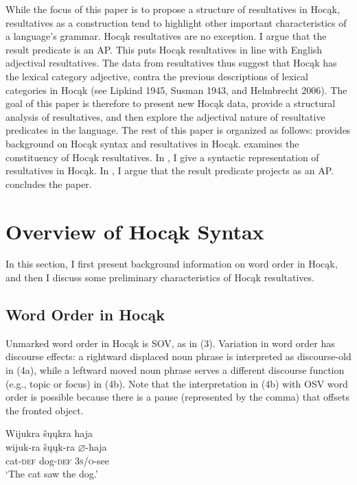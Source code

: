 \documentclass[output=paper]{LSP/langsci}
\begin{document}
While the focus of this paper is to propose a structure of resultatives in Hocąk, resultatives as a construction tend to highlight other important characteristics of a language's grammar. Hocąk resultatives are no exception. I argue that the result predicate is an AP. This puts Hocąk resultatives in line with English adjectival resultatives. The data from resultatives
thus suggest that Hocąk has the lexical category adjective, contra the previous descriptions of lexical categories in Hocąk (see Lipkind 1945, Susman 1943, and Helmbrecht 2006). The goal of this paper is therefore to present new Hocąk data, provide a structural analysis of resultatives, and then explore the adjectival nature of resultative predicates in the language. The rest of this paper is organized as follows:  provides background on Hocąk syntax and resultatives in Hocąk.  examines the constituency of Hocąk resultatives. In , I give a syntactic representation of resultatives in Hocąk. In , I argue that the result predicate projects as an AP.  concludes the paper.

\section{Overview of Hocąk Syntax}

In this section, I first present background information on word order in Hocąk, and then I discuss some preliminary characteristics of Hocąk resultatives.

\subsection{Word Order in Hocąk}

Unmarked word order in Hocąk is SOV, as in (3). Variation in word order has discourse effects: a rightward displaced noun phrase is interpreted as discourse-old in (4a), while a leftward moved noun phrase serves a different discourse function (e.g., topic or focus) in (4b). Note that the interpretation in (4b) with OSV word order is possible because there is a pause (represented by the comma) that offsets the fronted object.

\begin{exe}

\ex \glll Wijukra šųųkra haja \\
 wijuk-ra šųųk-ra {$\varnothing$}-haja\\
cat-\textsc{def} dog-\textsc{def} \textsc{3s/o}-see\\
\glt `The cat saw the dog.'

\end{exe}
\end{document}

